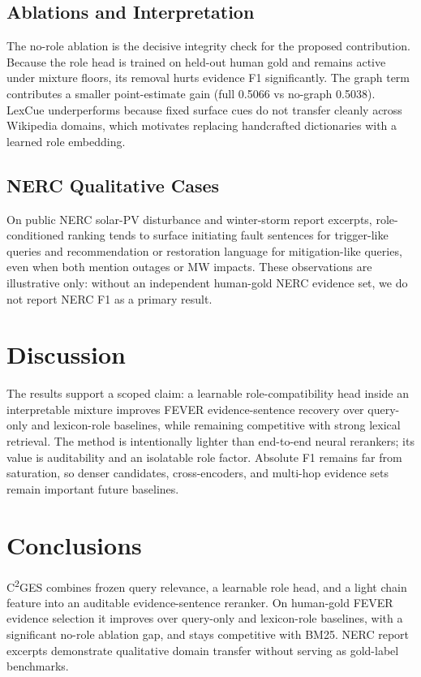 \documentclass[applsci,article,submit,moreauthors]{Definitions/mdpi}
\newcommand{\cges}{C\textsuperscript{2}GES}
\begin{document}
\subsection{Ablations and Interpretation}
The no-role ablation is the decisive integrity check for the proposed contribution. Because the role head is trained on held-out human gold and remains active under mixture floors, its removal hurts evidence F1 significantly. The graph term contributes a smaller point-estimate gain (full 0.5066 vs no-graph 0.5038). LexCue underperforms because fixed surface cues do not transfer cleanly across Wikipedia domains, which motivates replacing handcrafted dictionaries with a learned role embedding.

\subsection{NERC Qualitative Cases}
On public NERC solar-PV disturbance and winter-storm report excerpts, role-conditioned ranking tends to surface initiating fault sentences for trigger-like queries and recommendation or restoration language for mitigation-like queries, even when both mention outages or MW impacts. These observations are illustrative only: without an independent human-gold NERC evidence set, we do not report NERC F1 as a primary result.

\section{Discussion}
The results support a scoped claim: a learnable role-compatibility head inside an interpretable mixture improves FEVER evidence-sentence recovery over query-only and lexicon-role baselines, while remaining competitive with strong lexical retrieval. The method is intentionally lighter than end-to-end neural rerankers; its value is auditability and an isolatable role factor. Absolute F1 remains far from saturation, so denser candidates, cross-encoders, and multi-hop evidence sets remain important future baselines.

\section{Conclusions}
\label{sec:conclusion}

\cges{} combines frozen query relevance, a learnable role head, and a light chain feature into an auditable evidence-sentence reranker. On human-gold FEVER evidence selection it improves over query-only and lexicon-role baselines, with a significant no-role ablation gap, and stays competitive with BM25. NERC report excerpts demonstrate qualitative domain transfer without serving as gold-label benchmarks.
\end{document}
